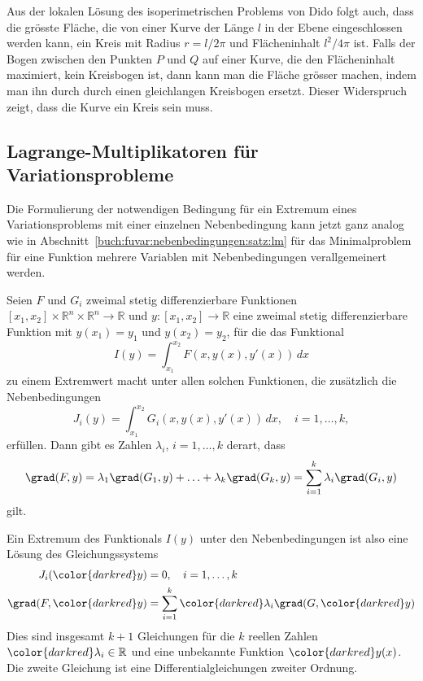 Aus der lokalen Lösung des isoperimetrischen Problems von Dido
folgt auch, dass die grösste Fläche, die von einer Kurve der Länge
$l$ in der Ebene eingeschlossen werden kann, ein Kreis mit Radius
$r=l/2\pi$ und Flächeninhalt $l^2/4\pi$ ist.
Falls der Bogen zwischen den Punkten $P$ und $Q$ auf einer Kurve, die
den Flächeninhalt maximiert, kein Kreisbogen ist, dann kann man die
Fläche grösser machen, indem man ihn durch durch einen gleichlangen
Kreisbogen ersetzt.
Dieser Widerspruch zeigt, dass die Kurve ein Kreis sein muss.

%
%
\subsection{Lagrange-Multiplikatoren für Variationsprobleme
\label{buch:nebenbedingungen:lagrangemult:subsection:lagrangemult}}
Die Formulierung der notwendigen Bedingung für ein Extremum eines
Variationsproblems mit einer einzelnen Nebenbedingung kann jetzt
ganz analog wie in Abschnitt~\ref{buch:fuvar:nebenbedingungen:satz:lm}
für das Minimalproblem für eine
Funktion mehrere Variablen mit Nebenbedingungen verallgemeinert
werden.

\begin{satz}
Seien $F$ und $G_i$ zweimal stetig differenzierbare Funktionen
$[x_1,x_2]\times\mathbb{R}^n\times\mathbb{R}^n\to\mathbb{R}$
und $y\colon[x_1,x_2]\to\mathbb{R}$ eine zweimal stetig
differenzierbare Funktion mit $y(x_1)=y_1$ und $y(x_2)=y_2$, für die
das Funktional
\[
I(y)
=
\int_{x_1}^{x_2} F(x,y(x),y'(x))\,dx
\]
zu einem Extremwert macht unter allen solchen Funktionen, die zusätzlich
die Nebenbedingungen
\[
J_i(y)
=
\int_{x_1}^{x_2}
G_i(x,y(x),y'(x))\,dx,
\quad
i=1,\dots,k,
\]
erfüllen.
Dann gibt es Zahlen $\lambda_i$, $i=1,\dots,k$ derart, dass
\[
\grad(F,y)
=
\lambda_1\grad(G_1,y)+\ldots+\lambda_k\grad(G_k,y)
=
\sum_{i=1}^k \lambda_i \grad(G_i,y)
\]
gilt.
\end{satz}

Ein Extremum des Funktionals $I(y)$ unter den Nebenbedingungen ist
also eine Lösung des Gleichungssystems
\begin{align}
J_i({\color{darkred}y})&=0,\quad i=1,\dots,k\\
\grad(F,{\color{darkred}y})
&=\sum_{i=1}^k {\color{darkred}\lambda_i} \grad(G,{\color{darkred}y})
\end{align}
Dies sind insgesamt $k+1$ Gleichungen für die $k$ reellen Zahlen
${\color{darkred}\lambda_i}\in\mathbb{R}$ und eine unbekannte Funktion
${\color{darkred}y(x)}$.
Die zweite Gleichung ist eine Differentialgleichungen zweiter Ordnung.



